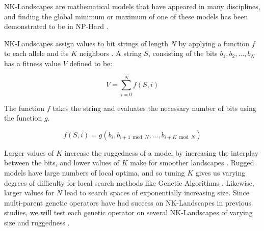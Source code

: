 NK-Landscapes are mathematical models that have appeared in many disciplines, and finding the global minimum or maximum of one of these models has been demonstrated to be in NP-Hard \cite{Weinberger96}.  

NK-Landscapes assign values to bit strings of length $N$ by applying a function $f$ to each allele and its $K$ neighbors \cite{Kauffman93}. A string $S$, consisting of the bits $b_1,b_2,\ldots,b_N$ has a fitness value $V$ defined to be:

\[ V = \sum\limits_{i = 0}^{N} f(S,i) \]

The function $f$ takes the string and evaluates the necessary number of bits using the function $g$.

\[ f(S,i) = g(b_i, b_{i+1 \bmod{N}}, \ldots, b_{i+K \bmod{N}}) \]

Larger values of $K$ increase the ruggedness of a model by increasing the interplay between the bits, and lower values of $K$ make for smoother landscapes \cite{Kauffman93}. Rugged models have large numbers of local optima, and so tuning $K$ gives us varying degrees of difficulty for local search methods like Genetic Algorithms \cite{Russell10,Skellett05}. Likewise, larger values for $N$ lead to search spaces of exponentially increasing size. Since multi-parent genetic operators have had success on NK-Landscapes in previous studies, we will test each genetic operator on several NK-Landscapes of varying size and ruggedness \cite{Eiben96,Skellett05}.
